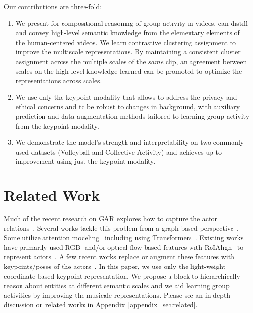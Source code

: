\documentclass[runningheads]{llncs}
\begin{document}
Our contributions are three-fold: 
\begin{enumerate}
    \item We present \ours 
for compositional reasoning of group activity in videos. \ours can distill and convey high-level semantic knowledge from the elementary elements of the human-centered videos.
We learn contrastive clustering assignment to improve the multiscale representations. By maintaining a consistent cluster assignment across the multiple scales of the \textit{same} clip, an agreement between scales on the high-level knowledge
    learned 
    can be promoted to
    optimize the representations across scales.
    \item We use only
    the keypoint modality that allows \ours
    to address the privacy and ethical concerns and 
    to be robust to changes in background, 
    with 
    auxiliary prediction and data augmentation methods tailored to learning group activity from the keypoint modality.
    \item  We demonstrate the model’s strength and interpretability on two commonly-used datasets (Volleyball and Collective Activity) and \ours achieves up to  improvement using just the keypoint modality.
 
\end{enumerate}







 

 
\section{Related Work}
\label{sec:related}
 


Much of the recent research on GAR explores how to capture the actor relations~\cite{ibrahim2018hierarchical,azar2019convolutional,arg,prl,pramono2020empowering}.
Several works tackle this problem from a graph-based perspective~\cite{ibrahim2018hierarchical,lu2019gaim,sam,higcin}.
Some utilize attention modeling~\cite{stagnet,xu2020group,lu2019gaim,yuan2021learning} including using
Transformers~\cite{actor-transformer,GroupFormer}.
Existing works 
have primarily used RGB- and/or optical-flow-based features with RoIAlign~\cite{he2017mask} to represent actors~\cite{higcin,stagnet,arg,ssu}.
A few recent works replace or augment these
features with 
keypoints/poses of the actors~\cite{POGARS,GIRN,actor-transformer,yuan2021learning}. 
 In this paper, we use only 
 the light-weight coordinate-based
 keypoint representation. 
We propose a \mtx block to hierarchically reason about entities at different semantic scales and we aid learning group activities by improving the musicale representations. Please see an in-depth discussion on related works in Appendix~\ref{appendix_sec:related}.
\end{document}
